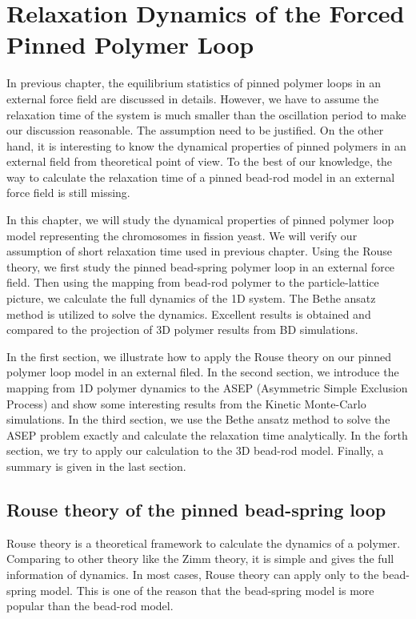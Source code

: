 \chapter{Relaxation Dynamics of the Forced Pinned Polymer Loop}
\graphicspath{{Chapter4/Figs/}}

In previous chapter, the equilibrium statistics of pinned polymer loops in an external force field are discussed in details. However, we have to assume the relaxation time of the system is much smaller than the oscillation period to make our discussion reasonable. The assumption need to be justified. On the other hand, it is interesting to know the dynamical properties of pinned polymers in an external field from theoretical point of view. To the best of our knowledge, the way to calculate the relaxation time of a pinned bead-rod model in an external force field is still missing. 

In this chapter, we will study the dynamical properties of pinned polymer loop model representing the chromosomes in fission yeast. We will verify our assumption of short relaxation time used in previous chapter. Using the Rouse theory, we first study the pinned bead-spring polymer loop in an external force field. Then using the mapping from bead-rod polymer to the particle-lattice picture, we calculate the full dynamics of the 1D system. The Bethe ansatz method is utilized to solve the dynamics. Excellent results is obtained and compared to the projection of 3D polymer results from BD simulations. 

In the first section, we illustrate how to apply the Rouse theory on our pinned polymer loop model in an external filed. In the second section, we introduce the mapping from 1D polymer dynamics to the ASEP (Asymmetric Simple Exclusion Process) and show some interesting results from the Kinetic Monte-Carlo simulations. In the third section, we use the Bethe ansatz method to solve the ASEP problem exactly and calculate the relaxation time analytically. In the forth section, we try to apply our calculation to the 3D bead-rod model. Finally, a summary is given in the last section. 



\section{Rouse theory of the pinned bead-spring loop}
\label{sec:rouse_theory_of_the_pinned_bead_spring_loop}
Rouse theory is a theoretical framework to calculate the dynamics of a polymer. Comparing to other theory like the Zimm theory, it is simple and gives the full information of dynamics. In most cases, Rouse theory can apply only to the bead-spring model. This is one of the reason that the bead-spring model is more popular than the bead-rod model. 

